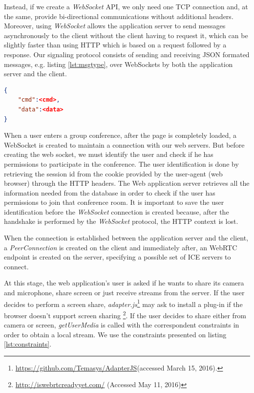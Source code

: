 Instead, if we create a \emph{WebSocket} \ac{API}, we only need one \ac{TCP} connection and, at the same, provide bi-directional communications without additional headers. Moreover, using \emph{WebSocket} allows the application server to send messages asynchronously to the client without the client having to request it, which can be slightly faster than using \ac{HTTP} which is based on a request followed by a response.
Our signaling protocol consists of sending and receiving \ac{JSON} formated messages, e.g. listing \ref{lst:msgtype}, over WebSockets by both the application server and the client. 

\begin{minipage}{\linewidth}
\begin{lstlisting}[caption={General structure of our WebSocket messages},label={lst:msgtype},language=json]
{
	"cmd":<cmd>,
	"data":<data>
}
\end{lstlisting}
\end{minipage}

When a user enters a group conference, after the page is completely loaded, a WebSocket is created to maintain a connection with our web servers. 
But before creating the web socket, we must identify the user and check if he has permissions to participate in the conference. The user identification is done by retrieving the session id from the cookie provided by the user-agent (web browser) through the \ac{HTTP} headers.
The Web application server retrieves all the information needed from the database in order to check if the user has permissions to join that conference room. It is important to save the user identification before the \emph{WebSocket} connection is created because, after the handshake is performed by the \emph{WebSocket} protocol\cite{rfc6455}, the \ac{HTTP} context is lost.

When the connection is established between the application server and the client, a \emph{PeerConnection} is created on the client and immediately after, an \ac{WebRTC} endpoint is created on the server, specifying a possible set of \ac{ICE} servers to connect.

At this stage, the web application's user is asked if he wants to share its camera and microphone, share screen or just receive streams from the server. If the user decides to perform a screen share, \emph{adapter.js}\footnote{\url{https://github.com/Temasys/AdapterJS}(accessed March 15, 2016).} may ask to install a plug-in if the browser doesn't support screen sharing \footnote{\url{http://iswebrtcreadyyet.com/} (Accessed May 11, 2016)}.
If the user decides to share either from camera or screen, \emph{getUserMedia} is called with the correspondent constraints in order to obtain a local stream. We use the constraints presented on listing \ref{lst:constraints}. 

